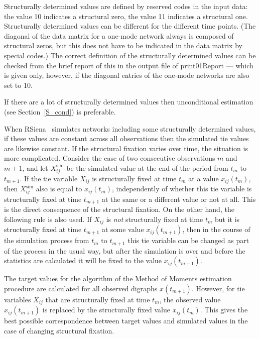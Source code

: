 \documentclass[a4paper,fleqn,11pt]{article}
\newcommand{\+}{\, + \,}
\newcommand{\RS}{{\sf \textsf{RSiena} }}
\begin{document}
Structurally determined values are defined by reserved codes in
the input data: the value 10 indicates a structural zero, the
value 11 indicates a structural one. Structurally determined
values can be different for the different time points. (The
diagonal of the data matrix for a one-mode network
always is composed of structural
zeros, but this does not have to be indicated in the data matrix
by special codes.) The correct definition of the structurally
determined values can be checked from the brief report of this in
the output file of \textsf{print01Report} --- which is given only,
however, if the diagonal entries of the one-mode networks are also
set to 10.

If there are a lot of structurally determined values
then unconditional estimation  (see Section~\ref{S_cond})
is preferable.

When \RS\ simulates networks including some structurally determined values,
if these values are constant across all observations then
the simulated tie values are likewise constant.
If the structural fixation varies over time, the situation
is more complicated.
Consider the case of two consecutive observations
$m$ and $m+1$,
and let $X^{\text{sim}}_{ij}$ be the simulated value
at the end of the period from $t_m$ to $t_{m+1}$.
If the tie variable $X_{ij}$ is structurally fixed at time $t_m$
at a value $x_{ij}(t_m)$,
then $X^{\text{sim}}_{ij}$ also is equal to $x_{ij}(t_m)$,
independently of whether this tie variable is structurally fixed
at time $t_{m+1}$ at the same or a different value or not at all.
This is the direct consequence of the structural fixation.
On the other hand, the following rule is also used.
If $X_{ij}$ is \emph{not} structurally fixed at time $t_m$
but it is structurally fixed at time $t_{m+1}$ at some value $x_{ij}(t_{m+1})$,
then in the course of the simulation process from  $t_m$ to $t_{m+1}$
this tie variable can be changed as part of the process in the usual way,
but after the simulation is over and before the statistics are calculated it will be fixed
to the value $x_{ij}(t_{m+1})$.

The target values for the algorithm of the Method of Moments estimation
procedure are calculated for all observed digraphs $x(t_{m+1})$.
However, for tie variables $X_{ij}$ that are
structurally fixed at time $t_m$, the observed value  $x_{ij}(t_{m+1})$
is replaced by the structurally fixed value  $x_{ij}(t_{m})$.
This gives the best possible correspondence between target values
and simulated values in the case of changing structural fixation.
\end{document}
